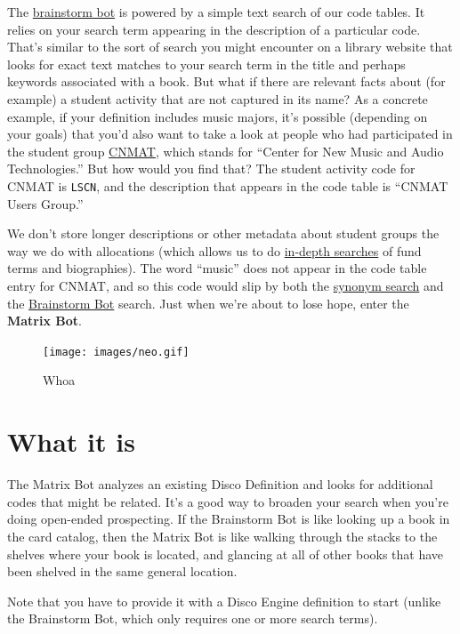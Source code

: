 \documentclass[]{book}
\begin{document}
The \protect\hyperlink{brainstorm-bot}{brainstorm bot} is powered by a simple text search of our code tables. It relies on your search term appearing in the description of a particular code. That's similar to the sort of search you might encounter on a library website that looks for exact text matches to your search term in the title and perhaps keywords associated with a book. But what if there are relevant facts about (for example) a student activity that are not captured in its name? As a concrete example, if your definition includes music majors, it's possible (depending on your goals) that you'd also want to take a look at people who had participated in the student group \href{http://cnmat.berkeley.edu/}{CNMAT}, which stands for ``Center for New Music and Audio Technologies.'' But how would you find that? The student activity code for CNMAT is \texttt{LSCN}, and the description that appears in the code table is ``CNMAT Users Group.''

We don't store longer descriptions or other metadata about student groups the way we do with allocations (which allows us to do \protect\hyperlink{searching-fund-text}{in-depth searches} of fund terms and biographies). The word ``music'' does not appear in the code table entry for CNMAT, and so this code would slip by both the \protect\hyperlink{synonym-search}{synonym search} and the \protect\hyperlink{brainstorm-bot}{Brainstorm Bot} search. Just when we're about to lose hope, enter the \textbf{Matrix Bot}.

\begin{figure}
\centering
\texttt{[image: images/neo.gif]}
\caption{Whoa}
\end{figure}

\hypertarget{what-it-is}{%
\section{What it is}\label{what-it-is}}

The Matrix Bot analyzes an existing Disco Definition and looks for additional codes that might be related. It's a good way to broaden your search when you're doing open-ended prospecting. If the Brainstorm Bot is like looking up a book in the card catalog, then the Matrix Bot is like walking through the stacks to the shelves where your book is located, and glancing at all of other books that have been shelved in the same general location.

Note that you have to provide it with a Disco Engine definition to start (unlike the Brainstorm Bot, which only requires one or more search terms).
\end{document}
